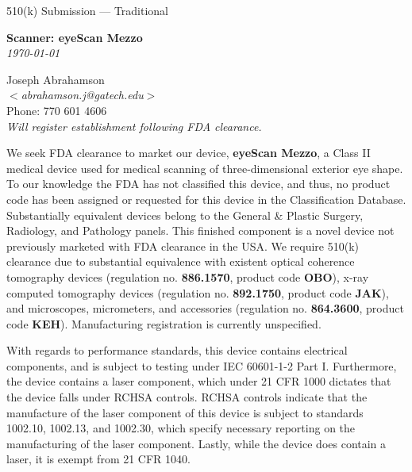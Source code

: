 \newpage
{}
\singlespacing

\begin{flushright}
  \huge{510(k) Submission --- Traditional}\\[.5in]
  
  \begin{minipage}{0.8\textwidth}
    \begin{flushright}
      \large \textbf{Scanner: eyeScan Mezzo} \\
      \textit{\today}
    \end{flushright}
  \end{minipage}
\end{flushright}

\begin{flushleft}
  Joseph Abrahamson\\
  $<$\textit{abrahamson.j@gatech.edu}$>$ \\
  Phone: 770 601 4606 \\[1em]
  
  \textit{Will register establishment following FDA clearance.}
\end{flushleft}
\vspace{4em}

\onehalfspacing

We seek FDA clearance to market our device, \textbf{eyeScan Mezzo}, a
Class II medical device used for medical scanning of three-dimensional
exterior eye shape. To our knowledge the FDA has not classified this
device, and thus, no product code has been assigned or requested for
this device in the Classification Database. Substantially equivalent
devices belong to the General \& Plastic Surgery, Radiology, and
Pathology panels. This finished component is a novel device not
previously marketed with FDA clearance in the USA. We require 510(k)
clearance due to substantial equivalence with existent optical
coherence tomography devices (regulation no. \textbf{886.1570},
product code \textbf{OBO}), x-ray computed tomography devices
(regulation no. \textbf{892.1750}, product code \textbf{JAK}), and
microscopes, micrometers, and accessories (regulation
no. \textbf{864.3600}, product code \textbf{KEH}). Manufacturing
registration is currently unspecified. 

With regards to performance standards, this device contains electrical
components, and is subject to testing under IEC 60601-1-2 Part
I. Furthermore, the device contains a laser component, which under 21
CFR 1000 dictates that the device falls under RCHSA controls. RCHSA
controls indicate that the manufacture of the laser component of this
device is subject to standards 1002.10, 1002.13, and 1002.30, which
specify necessary reporting on the manufacturing of the laser
component. Lastly, while the device does contain a laser, it is exempt
from 21 CFR 1040.


